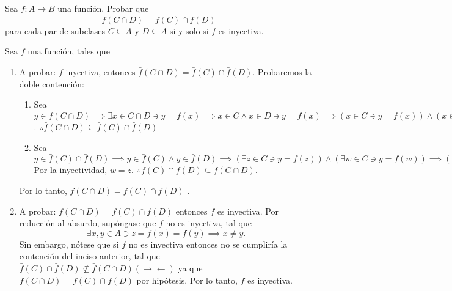 \begin{problema}[Problema 8]
	Sea $f: A \rightarrow B$ una función. Probar que 
	$$
	\bar{f}(C \cap D)=\bar{f}(C) \cap \bar{f}(D)
	$$
	para cada par de subclases $C \subseteq A$ y $D \subseteq A$ si y solo si $f$ es inyectiva.
\end{problema}
\begin{dem}
	Sea $f$ una función, tales que 
	\begin{enumerate}
		
		\item [$(\impliedby)$ ]  A probar: $f$ inyectiva, entonces $\bar{f}(C \cap D)=\bar{f}(C) \cap \bar{f}(D)$. Probaremos la doble contención: 
		\begin{enumerate}
		\item[$(\supseteq)$] Sea $y\in \bar{f}(C \cap D)\implies \exists x \in C\cap D \ni y = f(x)\implies x\in C \wedge x\in D \ni y=f(x)\implies (x\in C\ni y=f(x))\wedge (x\in D\ni y=f(x)) \implies x\in \bar{f}(C) \cap \bar{f}(D)$. $\therefore \bar{f}(C \cap D)\subseteq \bar{f}(C) \cap \bar{f}(D)$
		\item[$(\subseteq)$] Sea $y\in \bar{f}(C) \cap \bar{f}(D) \implies y \in \bar{f}(C) \wedge y \in \bar{f}(D)\implies (\exists z\in C \ni y = f(z))\wedge (\exists w\in C\ni y = f(w))\implies (\exists z\in C)\wedge(\exists w \in C)\ni y= f(z)=f(w)\implies$ Por la inyectividad, $w=z$. $\therefore \bar{f}(C) \cap \bar{f}(D) \subseteq \bar{f}(C \cap D)$.
		
		\end{enumerate}
	Por lo tanto, $\bar{f}(C \cap D)=\bar{f}(C) \cap \bar{f}(D) $ .
		\item [$(\implies)$ ] A probar: $\bar{f}(C \cap D)=\bar{f}(C) \cap \bar{f}(D)$ entonces $f$ es inyectiva. Por reducción al absurdo, supóngase que $f$ no es inyectiva, tal que 
	$$\exists x,y \in A\ni z = f(x) = f(y) \implies x\neq y.$$
	Sin embargo, nótese que si $f$ no es inyectiva entonces no se cumpliría la contención del inciso anterior, tal que $\bar{f}(C) \cap \bar{f}(D) \not \subseteq \bar{f}(C \cap D) (\to \gets)$ ya que $\bar{f}(C \cap D)=\bar{f}(C) \cap \bar{f}(D)$ por hipótesis. Por lo tanto, $f$ es inyectiva. 
	\end{enumerate}


\end{dem}




